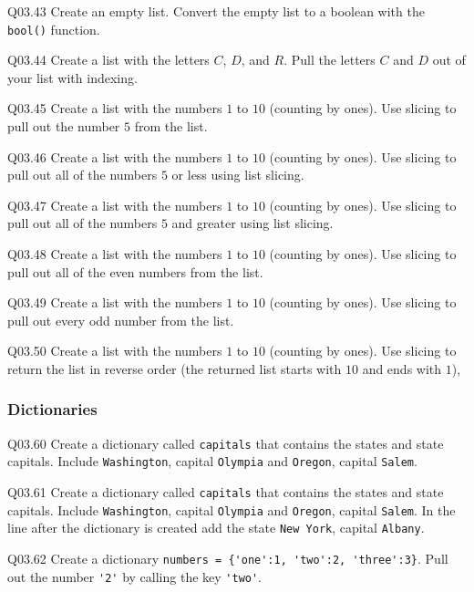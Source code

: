 \documentclass{book}
\begin{document}
Q03.43 Create an empty list. Convert the empty list to a boolean with
the \lstinline!bool()! function.

Q03.44 Create a list with the letters \(C\), \(D\), and \(R\). Pull the
letters \(C\) and \(D\) out of your list with indexing.

Q03.45 Create a list with the numbers \(1\) to \(10\) (counting by
ones). Use slicing to pull out the number \(5\) from the list.

Q03.46 Create a list with the numbers \(1\) to \(10\) (counting by
ones). Use slicing to pull out all of the numbers \(5\) or less using
list slicing.

Q03.47 Create a list with the numbers \(1\) to \(10\) (counting by
ones). Use slicing to pull out all of the numbers \(5\) and greater
using list slicing.

Q03.48 Create a list with the numbers \(1\) to \(10\) (counting by
ones). Use slicing to pull out all of the even numbers from the list.

Q03.49 Create a list with the numbers \(1\) to \(10\) (counting by
ones). Use slicing to pull out every odd number from the list.

Q03.50 Create a list with the numbers \(1\) to \(10\) (counting by
ones). Use slicing to return the list in reverse order (the returned
list starts with \(10\) and ends with \(1\)),
    




    
        \subsubsection{Dictionaries}\label{dictionaries}

Q03.60 Create a dictionary called \lstinline!capitals! that contains the
states and state capitals. Include \lstinline!Washington!, capital
\lstinline!Olympia! and \lstinline!Oregon!, capital \lstinline!Salem!.

Q03.61 Create a dictionary called \lstinline!capitals! that contains the
states and state capitals. Include \lstinline!Washington!, capital
\lstinline!Olympia! and \lstinline!Oregon!, capital \lstinline!Salem!.
In the line after the dictionary is created add the state
\lstinline!New York!, capital \lstinline!Albany!.

Q03.62 Create a dictionary
\lstinline!numbers = {'one':1, 'two':2, 'three':3}!. Pull out the number
\lstinline!'2'! by calling the key \lstinline!'two'!.
\end{document}
